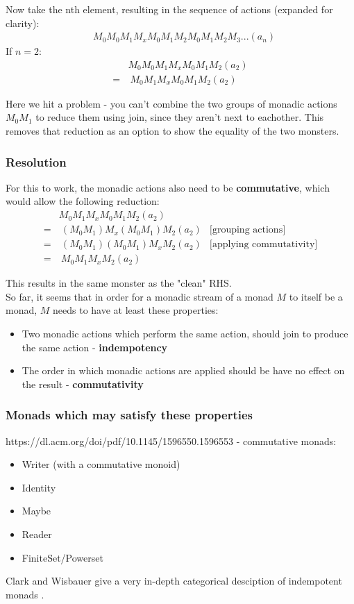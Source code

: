 \documentclass{article}
\begin{document}
Now take the nth element, resulting in the sequence of actions (expanded for clarity):
\begin{align*}
& M_0M_0M_1M_xM_0M_1M_2M_0M_1M_2M_3... (a_n)
\end{align*}
If $n = 2$:
\begin{align*}
& M_0M_0M_1M_xM_0M_1M_2 (a_2)\\
=&\ M_0M_1M_xM_0M_1M_2 (a_2)
\end{align*}

Here we hit a problem - you can't combine the two groups of monadic actions $M_0M_1$ to reduce them using join, since they aren't next to eachother. This removes that reduction as an option to show the equality of the two monsters. \\

\subsubsection{Resolution}

For this to work, the monadic actions also need to be \textbf{commutative}, which would allow the following reduction:
\begin{align*}
& M_0M_1M_xM_0M_1M_2 (a_2)\\
=&\ (M_0M_1)M_x(M_0M_1)M_2 (a_2) &\text{[grouping actions]}\\
=&\ (M_0M_1)(M_0M_1)M_xM_2 (a_2) &\text{[applying commutativity]}\\
=&\ M_0M_1M_xM_2 (a_2)
\end{align*}

This results in the same monster as the "clean" RHS.\\

So far, it seems that in order for a monadic stream of a monad $M$ to itself be a monad, $M$ needs to have at least these properties:
\begin{itemize}
	\item Two monadic actions which perform the same action, should join to produce the same action - \textbf{indempotency}
	\item The order in which monadic actions are applied should be have no effect on the result - \textbf{commutativity} 
\end{itemize}

\subsubsection{Monads which may satisfy these properties}

https://dl.acm.org/doi/pdf/10.1145/1596550.1596553 - commutative monads:
\begin{itemize}
	\item Writer (with a commutative monoid)
	\item Identity
	\item Maybe
	\item Reader
	\item FiniteSet/Powerset
\end{itemize}

Clark and Wisbauer give a very in-depth categorical desciption of indempotent monads \cite{indempotent_monads}.



\end{document}
